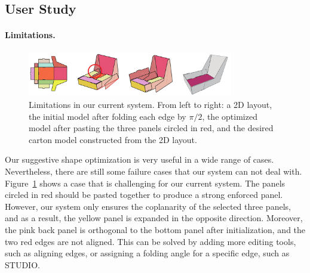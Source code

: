  
\subsection{User Study}
\label{sec:userstudy}



\paragraph{Limitations.}

\begin{figure} 
	\centering
	\includegraphics[width=0.8\textwidth]{images/moreLimitation}
	\caption{Limitations in our current system. From left to right: a 2D layout, the initial model after folding each edge by $\pi/2$, the optimized model after pasting the three panels circled in red, and the desired carton model constructed from the 2D layout. }
	\label{fig:failure}
\end{figure}


Our suggestive shape optimization is very useful in a wide range of cases. Nevertheless, there are still some failure cases that our system can not deal with. Figure~\ref{fig:failure} shows a case that is challenging for our current system. The panels circled in red should be pasted together to produce a strong enforced panel.
However, our system only ensures the coplanarity of the selected three panels, and as a result, the yellow panel is expanded in the opposite direction. 
%
Moreover, the pink back panel is orthogonal to the bottom panel after initialization, and the two red edges are not aligned.   
This can be solved by adding more editing tools, such as aligning edges, or assigning a folding angle for a specific edge, such as STUDIO.

